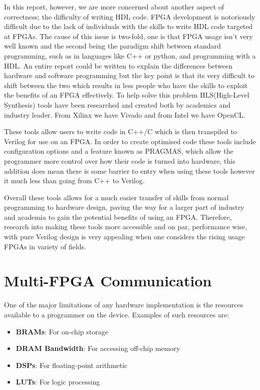 In this report, however, we are more concerned about another aspect of correctness; the difficulty of writing HDL code. FPGA development is notoriously difficult due to the lack of individuals with the skills to write HDL code targeted at FPGAs. The cause of this issue is two-fold, one is that FPGA usage isn't very well known and the second being the paradigm shift between standard programming, such as in languages like C++ or python, and programming with a HDL. An entire report could be written to explain the differences between hardware and software programming but the key point is that its very difficult to shift between the two which results in less people who have the skills to exploit the benefits of an FPGA effectively. To help solve this problem HLS(High-Level Synthesis) tools have been researched and created both by academics and industry leader. From Xilinx we have Vivado and from Intel we have OpenCL.

These tools allow users to write code in C++/C which is then transpiled to Verilog for use on an FPGA. In order to create optimised code these tools include configuration options and a feature known as PRAGMAS, which allow the programmer more control over how their code is turned into hardware, this addition does mean there is some barrier to entry when using these tools however it much less than going from C++ to Verilog. 

Overall these tools allows for a much easier transfer of skills from normal programming to hardware design, paving the way for a larger part of industry and academia to gain the potential benefits of using an FPGA. Therefore, research into making these tools more accessible and on par, performance wise, with pure Verilog design is very appealing when one considers the rising usage FPGAs in variety of fields\cite{fpga-market}.

\section{Multi-FPGA Communication}

One of the major limitations of any hardware implementation is the resources available to a programmer on the device. Examples of such resources are:

\begin{itemize}
    \item \textbf{BRAMs}: For on-chip storage
    \item \textbf{DRAM Bandwidth}: For accessing off-chip memory
    \item \textbf{DSPs}: For floating-point arithmetic
    \item \textbf{LUTs}: For logic processing 
\end{itemize}

